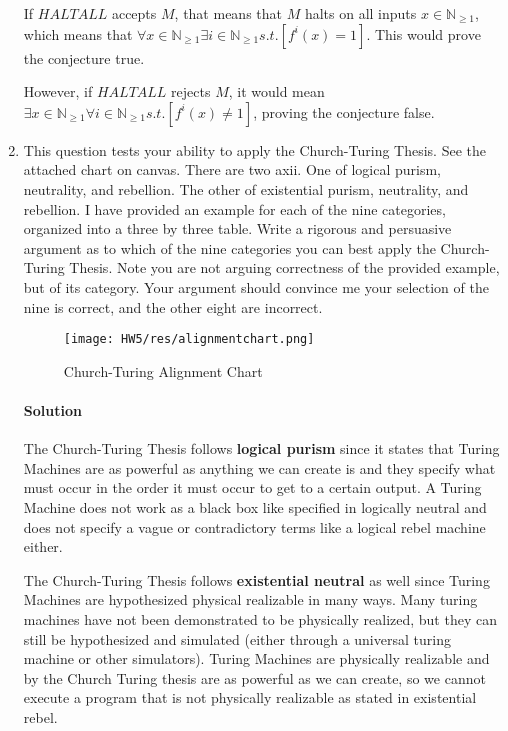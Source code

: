 \documentclass[11pt]{article}
\newcommand{\solution}[1]{\paragraph{Solution}  }
\begin{document}
\begin{enumerate}
    If $HALTALL$ accepts $M$, that means that $M$ halts on all inputs $x \in \mathbb{N}_{\geq 1}$, which means that $\forall x \in \mathbb{N}_{\geq 1} \exists i \in \mathbb{N}_{\geq 1} s.t. [f^i(x) = 1]$. This would prove the conjecture true.

    However, if $HALTALL$ rejects $M$, it would mean $\exists x \in \mathbb{N}_{\geq 1} \forall i \in \mathbb{N}_{\geq 1} s.t. [f^i(x) \neq 1]$, proving the conjecture false.
    
    \item This question tests your ability to apply the Church-Turing Thesis. See the attached chart on canvas. There are two axii. One of logical purism, neutrality, and rebellion. The other of existential purism, neutrality, and rebellion. I have provided an example for each of the nine categories, organized into a three by three table. Write a rigorous and persuasive argument as to which of the nine categories you can best apply the Church-Turing Thesis. Note you are not arguing correctness of the provided example, but of its category. Your argument should convince me your selection of the nine is correct, and the other eight are incorrect.

    \begin{figure}
        \centering
        \texttt{[image: HW5/res/alignmentchart.png]}
        \caption{Church-Turing Alignment Chart}
        \label{fig:my_label}
    \end{figure}

    \solution{} The Church-Turing Thesis follows \textbf{logical purism} since it states that Turing Machines are as powerful as anything we can create is and they specify what must occur in the order it must occur to get to a certain output. A Turing Machine does not work as a black box like specified in logically neutral and does not specify a vague or contradictory terms like a logical rebel machine either.

    The Church-Turing Thesis follows \textbf{existential neutral} as well since Turing Machines are hypothesized physical realizable in many ways. Many turing machines have not been demonstrated to be physically realized, but they can still be hypothesized and simulated (either through a universal turing machine or other simulators). Turing Machines are physically realizable and by the Church Turing thesis are as powerful as we can create, so we cannot execute a program that is not physically realizable as stated in existential rebel.
    
    \end{enumerate}
\end{document}
